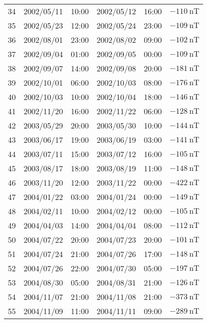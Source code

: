 \begin{table}[h]
\begin{adjustbox}{width=\textwidth,totalheight=0.9\textheight,keepaspectratio}
\begin{tabular}{cccccc}
    34 & 2002/05/11 & 10:00 & 2002/05/12 & 16:00 & $ \SI{-110}{\nano\tesla}$ \\
    35 & 2002/05/23 & 12:00 & 2002/05/24 & 23:00 & $ \SI{-109}{\nano\tesla}$ \\
    36 & 2002/08/01 & 23:00 & 2002/08/02 & 09:00 & $ \SI{-102}{\nano\tesla}$ \\
    37 & 2002/09/04 & 01:00 & 2002/09/05 & 00:00 & $ \SI{-109}{\nano\tesla}$ \\
    38 & 2002/09/07 & 14:00 & 2002/09/08 & 20:00 & $ \SI{-181}{\nano\tesla}$ \\
    39 & 2002/10/01 & 06:00 & 2002/10/03 & 08:00 & $ \SI{-176}{\nano\tesla}$ \\
    40 & 2002/10/03 & 10:00 & 2002/10/04 & 18:00 & $ \SI{-146}{\nano\tesla}$ \\
    41 & 2002/11/20 & 16:00 & 2002/11/22 & 06:00 & $ \SI{-128}{\nano\tesla}$ \\
    42 & 2003/05/29 & 20:00 & 2003/05/30 & 10:00 & $ \SI{-144}{\nano\tesla}$ \\
    43 & 2003/06/17 & 19:00 & 2003/06/19 & 03:00 & $ \SI{-141}{\nano\tesla}$ \\
    44 & 2003/07/11 & 15:00 & 2003/07/12 & 16:00 & $ \SI{-105}{\nano\tesla}$ \\
    45 & 2003/08/17 & 18:00 & 2003/08/19 & 11:00 & $ \SI{-148}{\nano\tesla}$ \\
    46 & 2003/11/20 & 12:00 & 2003/11/22 & 00:00 & $ \SI{-422}{\nano\tesla}$ \\
    47 & 2004/01/22 & 03:00 & 2004/01/24 & 00:00 & $ \SI{-149}{\nano\tesla}$ \\
    48 & 2004/02/11 & 10:00 & 2004/02/12 & 00:00 & $ \SI{-105}{\nano\tesla}$ \\
    49 & 2004/04/03 & 14:00 & 2004/04/04 & 08:00 & $ \SI{-112}{\nano\tesla}$ \\
    50 & 2004/07/22 & 20:00 & 2004/07/23 & 20:00 & $ \SI{-101}{\nano\tesla}$ \\
    51 & 2004/07/24 & 21:00 & 2004/07/26 & 17:00 & $ \SI{-148}{\nano\tesla}$ \\
    52 & 2004/07/26 & 22:00 & 2004/07/30 & 05:00 & $ \SI{-197}{\nano\tesla}$ \\
    53 & 2004/08/30 & 05:00 & 2004/08/31 & 21:00 & $ \SI{-126}{\nano\tesla}$ \\
    54 & 2004/11/07 & 21:00 & 2004/11/08 & 21:00 & $ \SI{-373}{\nano\tesla}$ \\
    55 & 2004/11/09 & 11:00 & 2004/11/11 & 09:00 & $ \SI{-289}{\nano\tesla}$ \\

\end{tabular}
\end{adjustbox}
\end{table}
